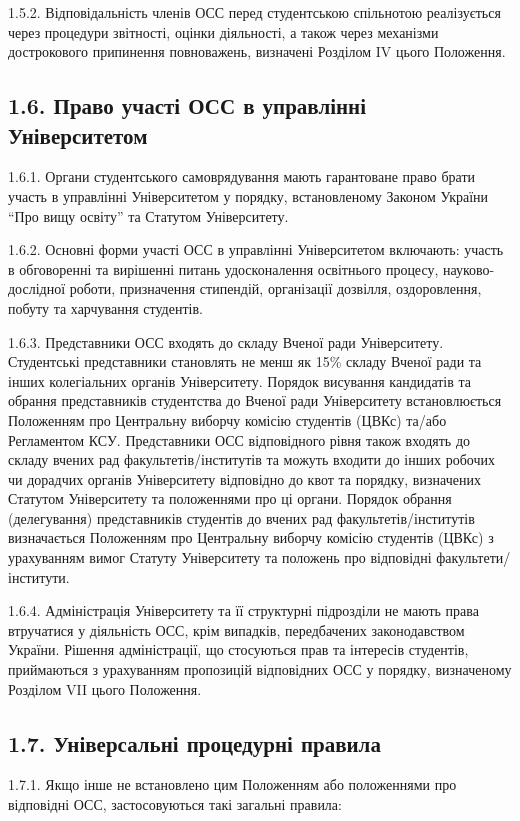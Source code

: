     1.5.2. Відповідальність членів ОСС перед студентською спільнотою реалізується через процедури звітності, оцінки діяльності, а також через механізми дострокового припинення повноважень, визначені Розділом IV цього Положення.

\subsection*{1.6. Право участі ОСС в управлінні Університетом}
    1.6.1. Органи студентського самоврядування мають гарантоване право брати участь в управлінні Університетом у порядку, встановленому Законом України ``Про вищу освіту'' та Статутом Університету.

    1.6.2. Основні форми участі ОСС в управлінні Університетом включають: участь в обговоренні та вирішенні питань удосконалення освітнього процесу, науково-дослідної роботи, призначення стипендій, організації дозвілля, оздоровлення, побуту та харчування студентів.

    1.6.3. Представники ОСС входять до складу Вченої ради Університету. Студентські представники становлять не менш як 15\% складу Вченої ради та інших колегіальних органів Університету. Порядок висування кандидатів та обрання представників студентства до Вченої ради Університету встановлюється Положенням про Центральну виборчу комісію студентів (ЦВКс) та/або Регламентом КСУ. Представники ОСС відповідного рівня також входять до складу вчених рад факультетів/інститутів та можуть входити до інших робочих чи дорадчих органів Університету відповідно до квот та порядку, визначених Статутом Університету та положеннями про ці органи. Порядок обрання (делегування) представників студентів до вчених рад факультетів/інститутів визначається Положенням про Центральну виборчу комісію студентів (ЦВКс) з урахуванням вимог Статуту Університету та положень про відповідні факультети/інститути.

    1.6.4. Адміністрація Університету та її структурні підрозділи не мають права втручатися у діяльність ОСС, крім випадків, передбачених законодавством України. Рішення адміністрації, що стосуються прав та інтересів студентів, приймаються з урахуванням пропозицій відповідних ОСС у порядку, визначеному Розділом VII цього Положення.

\subsection*{1.7. Універсальні процедурні правила}
    1.7.1. Якщо інше не встановлено цим Положенням або положеннями про відповідні ОСС, застосовуються такі загальні правила:

